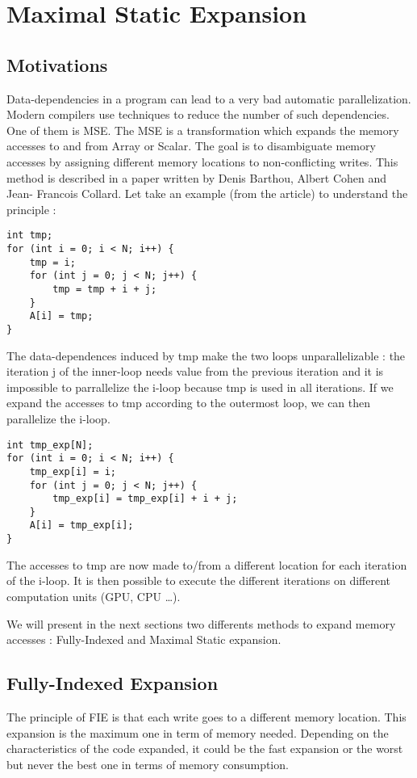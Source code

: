 \chapter{Maximal Static Expansion}\label{ch:MSE}

\section{Motivations}
Data-dependencies in a program can lead to a very bad automatic parallelization. Modern compilers use techniques to reduce the number of such dependencies. One of them is \ac{MSE}. The \ac{MSE} is a transformation which expands the memory accesses to and from Array or Scalar. The goal is to disambiguate memory accesses by assigning different memory locations to non-conflicting writes. This method is described in a paper written by Denis Barthou, Albert Cohen and Jean- Francois Collard\cite{MSE}. Let take an example (from the article) to understand the principle :
\begin{lstlisting}[frame=single]
int tmp;
for (int i = 0; i < N; i++) {
    tmp = i;
    for (int j = 0; j < N; j++) {
        tmp = tmp + i + j;
    }
    A[i] = tmp;
}
\end{lstlisting}

The data-dependences induced by tmp make the two loops unparallelizable : the iteration j of the inner-loop needs value from the previous iteration and it is impossible to parrallelize the i-loop because tmp is used in all iterations. If we expand the accesses to tmp according to the outermost loop, we can then parallelize the i-loop.

\begin{lstlisting}[frame=single]
int tmp_exp[N];
for (int i = 0; i < N; i++) {
    tmp_exp[i] = i;
    for (int j = 0; j < N; j++) {
        tmp_exp[i] = tmp_exp[i] + i + j;
    }
    A[i] = tmp_exp[i];
}
\end{lstlisting}

The accesses to tmp are now made to/from a different location for each iteration of the i-loop. It is then possible to execute the different iterations on different computation units (\ac{GPU}, \ac{CPU} …).

We will present in the next sections two differents methods to expand memory accesses : Fully-Indexed and Maximal Static expansion.

\section{Fully-Indexed Expansion}
The principle of \ac{FIE} is that each write goes to a different memory location. This expansion is the maximum one in term of memory needed. Depending on the characteristics of the code expanded, it could be the fast expansion or the worst but never the best one in terms of memory consumption.

